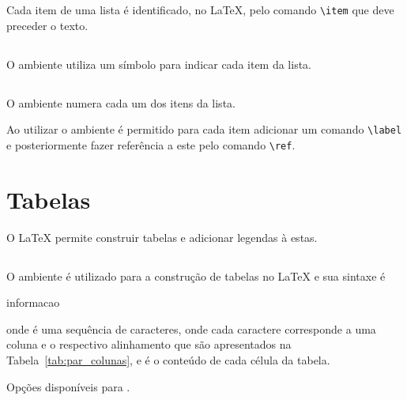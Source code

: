 Cada item de uma lista é identificado, no LaTeX, pelo comando
\lstinline!\item! que deve preceder o
texto.

\subsection{}
O ambiente  utiliza
um símbolo para indicar cada item da lista. \\

\subsection{}
O ambiente 
numera cada um dos itens da lista. \\

Ao utilizar o ambiente  é permitido para cada item adicionar
um comando \lstinline!\label! e posteriormente fazer referência a este pelo
comando \lstinline!\ref!.

\section{Tabelas}
O LaTeX permite construir tabelas e
adicionar legendas \`{a} estas.

\subsection{}
O ambiente  é
utilizado para a construção de tabelas no LaTeX e sua sintaxe é
\begin{code}
  \begin{tabular}[colunas]
    informacao
  \end{tabular}
\end{code}
onde  é uma sequência de caracteres, onde cada caractere
corresponde a uma coluna e o respectivo alinhamento que são apresentados na
Tabela~\ref{tab:par_colunas}, e  é o conteúdo de cada célula
da tabela.
\begin{table}[h!tb]
  \centering
  \caption{Opções disponíveis para .}
  \label{tab:par_colunas}
  
\end{table}

